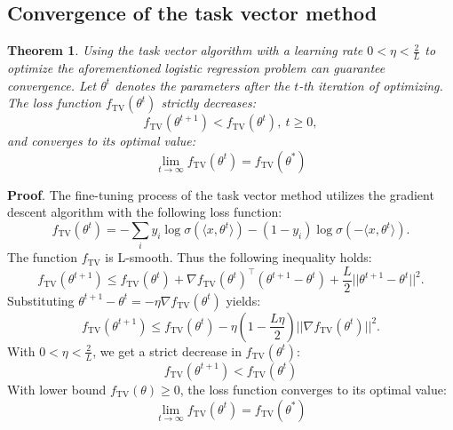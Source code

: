 \documentclass{article}
\theoremstyle{plain}
\newtheorem{theorem}{Theorem}[section]
\theoremstyle{definition}
\theoremstyle{remark}
\begin{document}
\subsection{Convergence of the task vector method}
\begin{theorem}
Using the task vector algorithm with a learning rate $0<\eta<\frac{2}{L}$ to optimize the aforementioned logistic regression problem can guarantee convergence. Let $\theta^t$ denotes the parameters after the $t$-th iteration of optimizing. The loss function $f_\text{TV}(\theta^t)$ strictly decreases:
\begin{equation}
    f_\text{TV}(\theta^{t+1})<f_\text{TV}(\theta^{t}),~t\geq0,
\end{equation}
and converges to its optimal value:
\begin{equation}
    \lim_{t\rightarrow\infty}f_\text{TV}(\theta^t)=f_\text{TV}(\theta^*)
\end{equation}
\end{theorem}
\textbf{Proof}. The fine-tuning process of the task vector method utilizes the gradient descent algorithm with the following loss function:
\begin{equation}
    f_\text{TV}(\theta^t)=-\sum_{i}y_i\log\sigma(\langle x,\theta^t\rangle)-(1-y_i)\log\sigma(-\langle x,\theta^t\rangle).
\end{equation}
The function $f_\text{TV}$ is L-smooth. Thus the following inequality holds:
\begin{equation}
    f_\text{TV}(\theta^{t+1})\leq f_\text{TV}(\theta^{t})+\nabla f_\text{TV}(\theta^{t})^\top(\theta^{t+1}-\theta^{t})+\frac{L}{2}||\theta^{t+1}-\theta^{t}||^2.
\end{equation}
Substituting $\theta^{t+1}-\theta^{t}=-\eta \nabla f_\text{TV}(\theta^{t})$ yields:
\begin{equation}
    f_\text{TV}(\theta^{t+1})\leq f_\text{TV}(\theta^{t})-\eta\left(1-\frac{L\eta}{2}\right)||\nabla f_\text{TV}(\theta^{t})||^2.
\end{equation}
With $0<\eta<\frac{2}{L}$, we get a strict decrease in $f_\text{TV}(\theta^{t})$:
\begin{equation}
    f_\text{TV}(\theta^{t+1})<f_\text{TV}(\theta^{t})
\end{equation}
With lower bound $f_\text{TV}(\theta)\geq 0$, the loss function converges to its optimal value:
\begin{equation}
    \lim_{t\rightarrow\infty}f_\text{TV}(\theta^t)=f_\text{TV}(\theta^*)
\end{equation}
\end{document}
